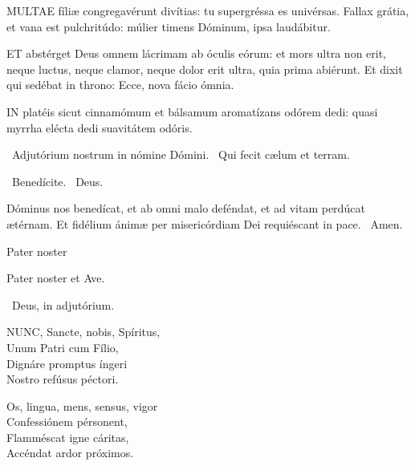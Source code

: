 
\lettrine[lines=2]{M}{ULTAE} fíliæ congregavérunt divítias: tu supergréssa es univérsas. Fallax grátia, et vana est pulchritúdo: múlier timens Dóminum, ipsa laudábitur.


\lettrine[lines=2]{E}{T} abstérget Deus omnem lácrimam ab óculis eórum: et mors ultra non erit, neque luctus, neque clamor, neque dolor erit ultra, quia prima abiérunt. Et dixit qui sedébat in throno: Ecce, nova fácio ómnia.


\lettrine[lines=2]{I}{N} platéis sicut cinnamómum et bálsamum aromatízans odórem dedi: quasi myrrha elécta dedi suavitátem odóris.

\V\ Adjutórium nostrum in nómine Dómini. \R\ Qui fecit cælum et terram.

\V\ Benedícite. \R\ Deus.

 Dóminus nos benedícat, et ab omni malo deféndat, et ad vitam perdúcat ætérnam. Et fidélium ánimæ per misericórdiam Dei requiéscant in pace. \R\ Amen.

 Pater noster 

\sectionornament




Pater noster et Ave.

\V\ Deus, in adjutórium.


\lettrine[lines=2]{N}{UNC}, Sancte, nobis, Spíritus,\\
Unum Patri cum Fílio,\\
Dignáre promptus íngeri\\
Nostro refúsus péctori.

Os, lingua, mens, sensus, vigor\\
Confessiónem pérsonent,\\
Flamméscat igne cáritas,\\
Accéndat ardor próximos.

